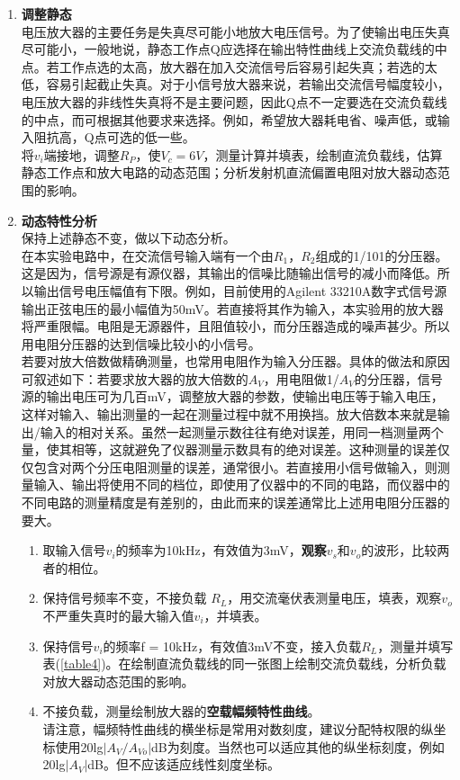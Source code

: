 \documentclass[a4paper]{article}
\begin{document}
\begin{enumerate}
\item \textbf{调整静态}\\
电压放大器的主要任务是失真尽可能小地放大电压信号。为了使输出电压失真尽可能小，一般地说，静态工作点Q应选择在输出特性曲线上交流负载线的中点。若工作点选的太高，放大器在加入交流信号后容易引起失真；若选的太低，容易引起截止失真。对于小信号放大器来说，若输出交流信号幅度较小，电压放大器的非线性失真将不是主要问题，因此Q点不一定要选在交流负载线的中点，而可根据其他要求来选择。例如，希望放大器耗电省、噪声低，或输入阻抗高，Q点可选的低一些。\\
将$v_i$端接地，调整$R_P$，使$V_c = 6V$，测量计算并填表，绘制直流负载线，估算静态工作点和放大电路的动态范围；分析发射机直流偏置电阻对放大器动态范围的影响。
\item \textbf{动态特性分析}\\
保持上述静态不变，做以下动态分析。\\
在本实验电路中，在交流信号输入端有一个由$R_1$，$R_2$组成的1/101的分压器。这是因为，信号源是有源仪器，其输出的信噪比随输出信号的减小而降低。所以输出信号电压幅值有下限。例如，目前使用的Agilent 33210A数字式信号源输出正弦电压的最小幅值为50mV。若直接将其作为输入，本实验用的放大器将严重限幅。电阻是无源器件，且阻值较小，而分压器造成的噪声甚少。所以用电阻分压器的达到信噪比较小的小信号。\\
若要对放大倍数做精确测量，也常用电阻作为输入分压器。具体的做法和原因可叙述如下：若要求放大器的放大倍数的$A_V$，用电阻做1/$A_V$的分压器，信号源的输出电压可为几百mV，调整放大器的参数，使输出电压等于输入电压，这样对输入、输出测量的一起在测量过程中就不用换挡。放大倍数本来就是输出/输入的相对关系。虽然一起测量示数往往有绝对误差，用同一档测量两个量，使其相等，这就避免了仪器测量示数具有的绝对误差。这种测量的误差仅仅包含对两个分压电阻测量的误差，通常很小。若直接用小信号做输入，则测量输入、输出将使用不同的档位，即使用了仪器中的不同的电路，而仪器中的不同电路的测量精度是有差别的，由此而来的误差通常比上述用电阻分压器的要大。
\begin{enumerate}
\item 取输入信号$v_i$的频率为10kHz，有效值为3mV，\textbf{观察}$v_s$和$v_o$的波形，比较两者的相位。
\item 保持信号频率不变，不接负载 $R_L$，用交流毫伏表测量电压，填表，观察$v_o$不严重失真时的最大输入值$v_i$，并填表。
\item 保持信号$v_i$的频率f = 10kHz，有效值3mV不变，接入负载$R_L$，测量并填写表(\ref{table4})。在绘制直流负载线的同一张图上绘制交流负载线，分析负载对放大器动态范围的影响。
\item 不接负载，测量绘制放大器的\textbf{空载幅频特性曲线}。\\
请注意，幅频特性曲线的横坐标是常用对数刻度，建议分配特权限的纵坐标使用20lg$|A_V/A_{Vo}|$dB为刻度。当然也可以适应其他的纵坐标刻度，例如20lg$|A_V|$dB。但不应该适应线性刻度坐标。\\


\end{enumerate}
\end{enumerate}
\end{document}

